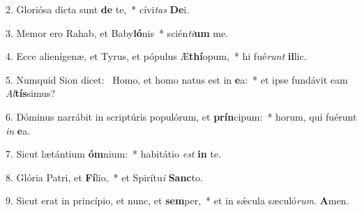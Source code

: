 2. Gloriósa dicta sunt \textbf{de} te,~*  cívi\textit{tas} \textbf{De}i.\

3. Memor ero Rahab, et Baby\textbf{ló}nis~*  scién\textit{ti}\textbf{um} me.\

4. Ecce alienígenæ, et Tyrus, et pópulus Æ\textbf{thí}opum,~*  hi fué\textit{runt} \textbf{il}lic.\

5. Numquid Sion dicet: \dag\  Homo, et homo natus est in \textbf{e}a:~*  et ipse fundávit eam \textit{Al}\textbf{tís}simus?\

6. Dóminus narrábit in scriptúris populórum, et \textbf{prín}cipum:~*  horum, qui fuérunt \textit{in} \textbf{e}a.\

7. Sicut lætántium \textbf{óm}nium:~*  habitátio \textit{est} \textbf{in} te.\

8. Glória Patri, et \textbf{Fí}lio,~*  et Spirítu\textit{i} \textbf{Sanc}to.\

9. Sicut erat in princípio, et nunc, et \textbf{sem}per,~*  et in sǽcula sæculó\textit{rum}. \textbf{A}men.\

